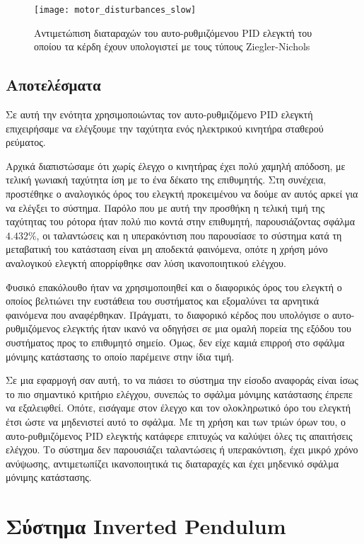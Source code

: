 \begin{figure}[h]
  \centering
  \texttt{[image: motor\_disturbances\_slow]}
  \caption{Αντιμετώπιση διαταραχών του αυτο-ρυθμιζόμενου PID ελεγκτή του οποίου τα κέρδη έχουν υπολογιστεί με τους τύπους Ziegler-Nichols}
  \label{fig:motor_disturbances_slow}
\end{figure}

\subsection{Αποτελέσματα}

Σε αυτή την ενότητα χρησιμοποιώντας τον αυτο-ρυθμιζόμενο PID ελεγκτή επιχειρήσαμε να ελέγξουμε την ταχύτητα ενός ηλεκτρικού κινητήρα σταθερού ρεύματος.

Αρχικά διαπιστώσαμε ότι χωρίς έλεγχο ο κινητήρας έχει πολύ χαμηλή απόδοση, με τελική γωνιακή ταχύτητα ίση με το ένα δέκατο της επιθυμητής. Στη συνέχεια, προστέθηκε ο αναλογικός όρος του ελεγκτή προκειμένου να δούμε αν αυτός αρκεί για να ελέγξει το σύστημα. Παρόλο που με αυτή την προσθήκη η τελική τιμή της ταχύτητας του ρότορα ήταν πολύ πιο κοντά στην επιθυμητή, παρουσιάζοντας σφάλμα $4.432\%$, οι ταλαντώσεις και η υπερακόντιση που παρουσίασε το σύστημα κατά τη μεταβατική του κατάσταση είναι μη αποδεκτά φαινόμενα, οπότε η χρήση μόνο αναλογικού ελεγκτή απορρίφθηκε σαν λύση ικανοποιητικού ελέγχου.

Φυσικό επακόλουθο ήταν να χρησιμοποιηθεί και ο διαφορικός όρος του ελεγκτή ο οποίος βελτιώνει την ευστάθεια του συστήματος και εξομαλύνει τα αρνητικά φαινόμενα που αναφέρθηκαν. Πράγματι, το διαφορικό κέρδος που υπολόγισε ο αυτο-ρυθμιζόμενος ελεγκτής ήταν ικανό να οδηγήσει σε μια ομαλή πορεία της εξόδου του συστήματος προς το επιθυμητό σημείο. Όμως, δεν είχε καμιά επιρροή στο σφάλμα μόνιμης κατάστασης το οποίο παρέμεινε στην ίδια τιμή.

Σε μια εφαρμογή σαν αυτή, το να πιάσει το σύστημα την είσοδο αναφοράς είναι ίσως το πιο σημαντικό κριτήριο ελέγχου, συνεπώς το σφάλμα μόνιμης κατάστασης έπρεπε να εξαλειφθεί. Οπότε, εισάγαμε στον έλεγχο και τον ολοκληρωτικό όρο του ελεγκτή έτσι ώστε να μηδενιστεί αυτό το σφάλμα. Με τη χρήση και των τριών όρων του, ο αυτο-ρυθμιζόμενος PID ελεγκτής κατάφερε επιτυχώς να καλύψει όλες τις απαιτήσεις ελέγχου. Το σύστημα δεν παρουσιάζει ταλαντώσεις ή υπερακόντιση, έχει μικρό χρόνο ανύψωσης, αντιμετωπίζει ικανοποιητικά τις διαταραχές και έχει μηδενικό σφάλμα μόνιμης κατάστασης.

\section{Σύστημα Inverted Pendulum} \label{sec:inverted_pendulum}

